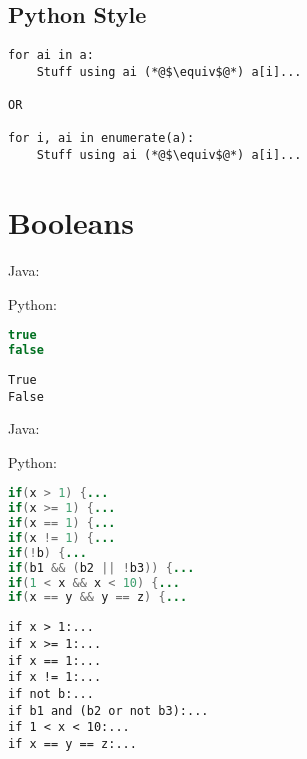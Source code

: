 \documentclass{article}
\begin{document}
\subsection{Python Style}
\begin{lstlisting}
for ai in a:
    Stuff using ai (*@$\equiv$@*) a[i]...

OR

for i, ai in enumerate(a):
    Stuff using ai (*@$\equiv$@*) a[i]...
\end{lstlisting}

\section{Booleans}
\begin{minipage}{0.45\linewidth}
    Java:
\end{minipage}
\hfill
\begin{minipage}{0.45\linewidth}
    Python:
\end{minipage}

\begin{minipage}{0.45\linewidth}
    \begin{lstlisting}[language=Java]
true
false
    \end{lstlisting}
\end{minipage}
\hfill
\begin{minipage}{0.45\linewidth}
    \begin{lstlisting}
True
False
    \end{lstlisting}
\end{minipage}

\begin{minipage}{0.45\linewidth}
    Java:
\end{minipage}
\hfill
\begin{minipage}{0.45\linewidth}
    Python:
\end{minipage}

\begin{minipage}{0.45\linewidth}
    \begin{lstlisting}[language=Java]
if(x > 1) {...
if(x >= 1) {...
if(x == 1) {...
if(x != 1) {...
if(!b) {...
if(b1 && (b2 || !b3)) {...
if(1 < x && x < 10) {...
if(x == y && y == z) {...
    \end{lstlisting}
\end{minipage}
\hfill
\begin{minipage}{0.45\linewidth}
    \begin{lstlisting}
if x > 1:...
if x >= 1:...
if x == 1:...
if x != 1:...
if not b:...
if b1 and (b2 or not b3):...
if 1 < x < 10:...
if x == y == z:...
    \end{lstlisting}
\end{minipage}
\end{document}
